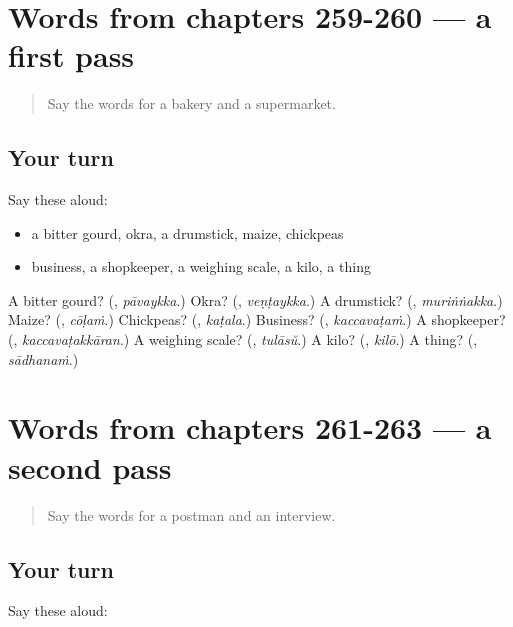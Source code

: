 \section[(dialogue)]{Words from chapters 259-260 — a first pass}

\label{lesson:ML-R263-first-pass-words-from-chapters-259-260}



\begin{quote}
Say the words for a bakery and a supermarket.
\end{quote}

\subsection*{Your turn}
Say these aloud:

\begin{itemize}
\raggedright
  \item a bitter gourd, okra, a drumstick, maize, chickpeas
  \item business, a shopkeeper, a weighing scale, a kilo, a thing
\end{itemize}

\begin{tcolorbox}[breakable,colback=teal!4,colframe=teal!35!black,title={Before you move on}]
A bitter gourd? (\textbf{}, \emph{pāvaykka}.) Okra? (\textbf{}, \emph{veṇṭaykka}.) A drumstick? (\textbf{}, \emph{muriṅṅakka}.) Maize? (\textbf{}, \emph{cōḷaṁ}.) Chickpeas? (\textbf{}, \emph{kaṭala}.) Business? (\textbf{}, \emph{kaccavaṭaṁ}.) A shopkeeper? (\textbf{}, \emph{kaccavaṭakkāran}.) A weighing scale? (\textbf{}, \emph{tulāsŭ}.) A kilo? (\textbf{}, \emph{kilō}.) A thing? (\textbf{}, \emph{sādhanaṁ}.)
\end{tcolorbox}
\section[(dialogue)]{Words from chapters 261-263 — a second pass}

\label{lesson:ML-R263-second-pass-words-from-chapters-261-263}



\begin{quote}
Say the words for a postman and an interview.
\end{quote}

\subsection*{Your turn}
Say these aloud:

